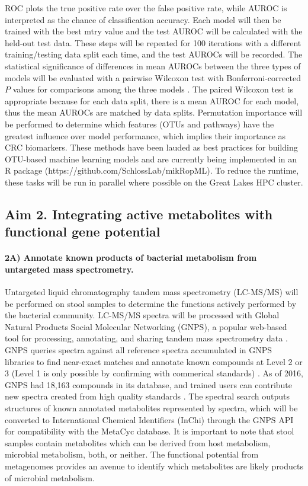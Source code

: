 \documentclass[11pt]{article}
\begin{document}
ROC plots the true positive rate over the false positive rate, while AUROC is interpreted as the chance of classification accuracy.
Each model will then be trained with the best mtry value and the test AUROC will be calculated with the held-out test data.
These steps will be repeated for 100 iterations with a different training/testing data split each time, and the test AUROCs will be recorded.
The statistical significance of differences in mean AUROCs between the three types of models will be evaluated with a pairwise Wilcoxon test with Bonferroni-corrected $P$ values for comparisons among the three models \cite{hannigan_diagnostic_2018}.
The paired Wilcoxon test is appropriate because for each data split, there is a mean AUROC for each model, thus the mean AUROCs are matched by data splits.
Permutation importance will be performed to determine which features (OTUs and pathways) have the greatest influence over model performance, which implies their importance as CRC biomarkers.
These methods have been lauded as best practices for building OTU-based machine learning models \cite{topcuoglu_framework_2020} and are currently being implemented in an R package (https://github.com/SchlossLab/mikRopML).
To reduce the runtime, these tasks will be run in parallel where possible on the Great Lakes HPC cluster.

\subsection*{Aim 2. Integrating active metabolites with functional gene potential}

\paragraph{2A) Annotate known products of bacterial metabolism from untargeted mass spectrometry.}

Untargeted liquid chromatography tandem mass spectrometry (LC-MS/MS) will be performed on stool samples to determine the functions actively performed by the bacterial community.
LC-MS/MS spectra will be processed with Global Natural Products Social Molecular Networking (GNPS), a popular web-based tool for processing, annotating, and sharing tandem mass spectrometry data \cite{wang_sharing_2016}.
GNPS queries spectra against all reference spectra accumulated in GNPS libraries to find near-exact matches and annotate known compounds at Level 2 or 3 (Level 1 is only possible by confirming with commerical standards) \cite{aron_reproducible_2020}.
As of 2016, GNPS had 18,163 compounds in its database, and trained users can contribute new spectra created from high quality standards \cite{vargas_protocol_2019}.
The spectral search outputs structures of known annotated metabolites represented by spectra, which will be converted to International Chemical Identifiers (InChi) through the GNPS API for compatibility with the MetaCyc database.
It is important to note that stool samples contain metabolites which can be derived from host metabolism, microbial metabolism, both, or neither.
The functional potential from metagenomes provides an avenue to identify which metabolites are likely products of microbial metabolism.
\end{document}
